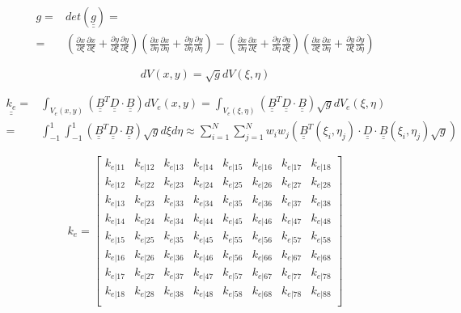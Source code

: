 \documentclass[a4paper]{jpconf}
\begin{document}
\begin{equation}
\begin{split}
g=&det\left(\underline{\underline{g}}\right)=\\=&\left(\frac{\partial x}{\partial\xi}\frac{\partial x}{\partial\xi}+\frac{\partial y}{\partial\xi}\frac{\partial y}{\partial\xi}\right)\left(\frac{\partial x}{\partial\eta}\frac{\partial x}{\partial\eta}+\frac{\partial y}{\partial\eta}\frac{\partial y}{\partial\eta}\right)-\left(\frac{\partial x}{\partial\eta}\frac{\partial x}{\partial\xi}+\frac{\partial y}{\partial\eta}\frac{\partial y}{\partial\xi}\right)\left(\frac{\partial x}{\partial\xi}\frac{\partial x}{\partial\eta}+\frac{\partial y}{\partial\xi}\frac{\partial y}{\partial\eta}\right)
\end{split}
\end{equation}

\begin{equation}
dV\left(x,y\right)=\sqrt{g}dV\left(\xi,\eta\right)
\end{equation}

\begin{equation}
\begin{split}
\underline{\underline{k_{e}}}=&\int_{V_{e}\left(x,y\right)}\left(\underline{\underline{B}}^{T}\underline{\underline{D}}\cdot\underline{\underline{B}}\right)dV_{e}\left(x,y\right)=\int_{V_{e}\left(\xi,\eta\right)}\left(\underline{\underline{B}}^{T}\underline{\underline{D}}\cdot\underline{\underline{B}}\right)\sqrt{g}dV_{e}\left(\xi,\eta\right)\\
=&\int_{-1}^{1}\int_{-1}^{1}\left(\underline{\underline{B}}^{T}\underline{\underline{D}}\cdot\underline{\underline{B}}\right)\sqrt{g}d\xi d\eta\approx \sum_{i=1}^{N}\sum_{j=1}^{N}w_{i}w_{j}\left(\underline{\underline{B}}^{T}\left(\xi_{i},\eta_{j}\right)\cdot\underline{\underline{D}}\cdot\underline{\underline{B}}\left(\xi_{i},\eta_{j}\right)\sqrt{g}\right)
\end{split}
\end{equation}

\begin{equation}
k_{e}=\begin{bmatrix}
k_{e|11}&k_{e|12}&k_{e|13}&k_{e|14}&k_{e|15}&k_{e|16}&k_{e|17}&k_{e|18}\\
k_{e|12}&k_{e|22}&k_{e|23}&k_{e|24}&k_{e|25}&k_{e|26}&k_{e|27}&k_{e|28}\\
k_{e|13}&k_{e|23}&k_{e|33}&k_{e|34}&k_{e|35}&k_{e|36}&k_{e|37}&k_{e|38}\\
k_{e|14}&k_{e|24}&k_{e|34}&k_{e|44}&k_{e|45}&k_{e|46}&k_{e|47}&k_{e|48}\\
k_{e|15}&k_{e|25}&k_{e|35}&k_{e|45}&k_{e|55}&k_{e|56}&k_{e|57}&k_{e|58}\\
k_{e|16}&k_{e|26}&k_{e|36}&k_{e|46}&k_{e|56}&k_{e|66}&k_{e|67}&k_{e|68}\\
k_{e|17}&k_{e|27}&k_{e|37}&k_{e|47}&k_{e|57}&k_{e|67}&k_{e|77}&k_{e|78}\\
k_{e|18}&k_{e|28}&k_{e|38}&k_{e|48}&k_{e|58}&k_{e|68}&k_{e|78}&k_{e|88}\\
\end{bmatrix}
\end{equation}
\end{document}
